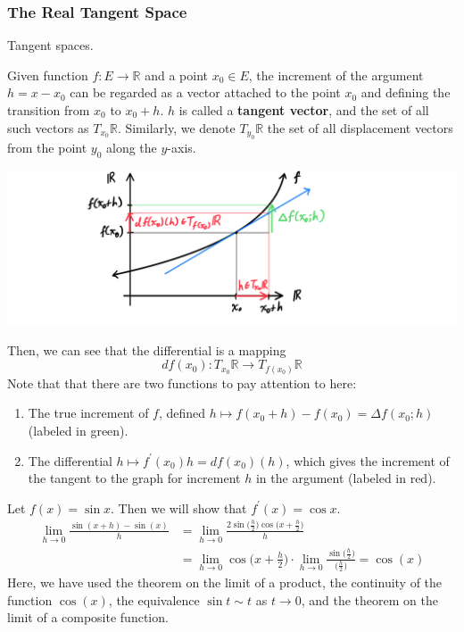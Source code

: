     \subsubsection{The Real Tangent Space}

    Tangent spaces. 

    \begin{definition}
      Given function $f: E \longrightarrow \mathbb{R}$ and a point $x_0 \in E$, the increment of the argument $h = x - x_0$ can be regarded as a vector attached to the point $x_0$ and defining the transition from $x_0$ to $x_0 + h$. $h$ is called a \textbf{tangent vector}, and the set of all such vectors as $T_{x_0} \mathbb{R}$. Similarly, we denote $T_{y_0} \mathbb{R}$ the set of all displacement vectors from the point $y_0$ along the $y$-axis. 
      \begin{center}
          \includegraphics[scale=0.25]{img/Tangent_Space_1_dimensional_in_R.PNG}
      \end{center}
      Then, we can see that the differential is a mapping
      \[df(x_0): T_{x_0} \mathbb{R} \longrightarrow T_{f(x_0)} \mathbb{R}\]
      Note that that there are two functions to pay attention to here: 
      \begin{enumerate}
        \item The true increment of $f$, defined $h \mapsto f(x_0 + h) - f(x_0) = \Delta f(x_0; h)$ (labeled in green). 
        \item The differential $h \mapsto f^\prime (x_0) h = df(x_0) (h)$, which gives the increment of the tangent to the graph for increment $h$ in the argument (labeled in red). 
      \end{enumerate}
    \end{definition}

    \begin{example}
      Let $f(x) = \sin{x}$. Then we will show that $f^\prime (x) = \cos{x}$. 
      \begin{align*}
          \lim_{h \rightarrow 0} \frac{\sin{(x+h)} - \sin(x)}{h} & = \lim_{h \rightarrow 0} \frac{2 \sin \big( \frac{h}{2} \big) \cos \big( x + \frac{h}{2} \big)}{h} \\
          & = \lim_{h \rightarrow 0} \cos \Big( x + \frac{h}{2} \Big) \cdot \lim_{h\rightarrow 0} \frac{\sin\big( \frac{h}{2}\big)}{\big(\frac{h}{2}\big)} = \cos(x)
      \end{align*}
      Here, we have used the theorem on the limit of a product, the continuity of the function $\cos(x)$, the equivalence $\sin{t} \sim t$ as $t \rightarrow 0$, and the theorem on the limit of a composite function. 
    \end{example}

